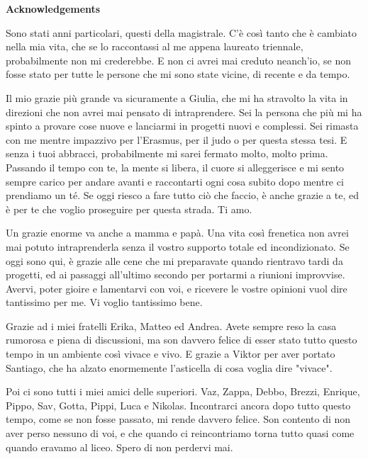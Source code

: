 \thispagestyle{empty}

\begin{center}
  {\bf \Huge Acknowledgements}
\end{center}

\vspace{2cm}

Sono stati anni particolari, questi della magistrale. C'è così tanto che è cambiato nella mia vita, che se lo raccontassi al me appena laureato triennale, probabilmente non mi crederebbe. E non ci avrei mai creduto neanch'io, se non fosse stato per tutte le persone che mi sono state vicine, di recente e da tempo.

Il mio grazie più grande va sicuramente a Giulia, che mi ha stravolto la vita in direzioni che non avrei mai pensato di intraprendere. Sei la persona che più mi ha spinto a provare cose nuove e lanciarmi in progetti nuovi e complessi. Sei rimasta con me mentre impazzivo per l'Erasmus, per il judo o per questa stessa tesi. E senza i tuoi abbracci, probabilmente mi sarei fermato molto, molto prima. Passando il tempo con te, la mente si libera, il cuore si alleggerisce e mi sento sempre carico per andare avanti e raccontarti ogni cosa subito dopo mentre ci prendiamo un té. Se oggi riesco a fare tutto ciò che faccio, è anche grazie a te, ed è per te che voglio proseguire per questa strada. Ti amo.

Un grazie enorme va anche a mamma e papà. Una vita così frenetica non avrei mai potuto intraprenderla senza il vostro supporto totale ed incondizionato. Se oggi sono qui, è grazie alle cene che mi preparavate quando rientravo tardi da progetti, ed ai passaggi all'ultimo secondo per portarmi a riunioni improvvise. Avervi, poter gioire e lamentarvi con voi, e ricevere le vostre opinioni vuol dire tantissimo per me. Vi voglio tantissimo bene.

Grazie ad i miei fratelli Erika, Matteo ed Andrea. Avete sempre reso la casa rumorosa e piena di discussioni, ma son davvero felice di esser stato tutto questo tempo in un ambiente così vivace e vivo. E grazie a Viktor per aver portato Santiago, che ha alzato enormemente l'asticella di cosa voglia dire "vivace".

Poi ci sono tutti i miei amici delle superiori. Vaz, Zappa, Debbo, Brezzi, Enrique, Pippo, Sav, Gotta, Pippi, Luca e Nikolas. Incontrarci ancora dopo tutto questo tempo, come se non fosse passato, mi rende davvero felice. Son contento di non aver perso nessuno di voi, e che quando ci reincontriamo torna tutto quasi come quando eravamo al liceo. Spero di non perdervi mai.

